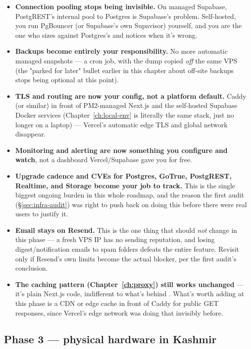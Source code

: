 \begin{itemize}
  \item \textbf{Connection pooling stops being invisible.} On managed Supabase, PostgREST's internal pool to Postgres is Supabase's problem. Self-hosted, you run PgBouncer (or Supabase's own Supavisor) yourself, and you are the one who sizes  against Postgres's  and notices when it's wrong.
  \item \textbf{Backups become entirely your responsibility.} No more automatic managed snapshots — a  cron job, with the dump copied \emph{off} the same VPS (the "parked for later" bullet earlier in this chapter about off-site backups stops being optional at this point).
  \item \textbf{TLS and routing are now your config, not a platform default.} Caddy (or similar) in front of PM2-managed Next.js and the self-hosted Supabase Docker services (Chapter~\ref{ch:local-env} is literally the same stack, just no longer on a laptop) — Vercel's automatic edge TLS and global network disappear.
  \item \textbf{Monitoring and alerting are now something you configure and watch}, not a dashboard Vercel/Supabase gave you for free.
  \item \textbf{Upgrade cadence and CVEs for Postgres, GoTrue, PostgREST, Realtime, and Storage become your job to track.} This is the single biggest ongoing burden in this whole roadmap, and the reason the first audit (\S\ref{sec:infra-audit}) was right to push back on doing this before there were real users to justify it.
  \item \textbf{Email stays on Resend.} This is the one thing that should \emph{not} change in this phase — a fresh VPS IP has no sending reputation, and losing digest/notification emails to spam folders defeats the entire feature. Revisit only if Resend's own limits become the actual blocker, per the first audit's conclusion.
  \item \textbf{The  caching pattern (Chapter~\ref{ch:proxy}) still works unchanged} — it's plain Next.js code, indifferent to what's behind . What's worth adding at this phase is a CDN or edge cache in front of Caddy for public GET responses, since Vercel's edge network was doing that invisibly before.
\end{itemize}

\subsection{Phase 3 --- physical hardware in Kashmir}

